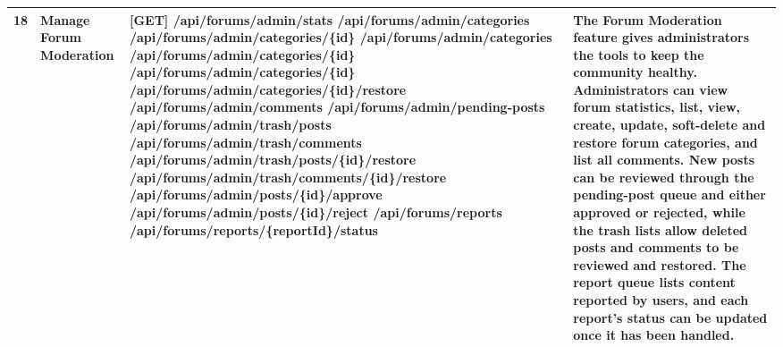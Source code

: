 \begin{longtable}{|C{0.7cm}|L{2.6cm}|S{6.6cm}|L{5.2cm}|}
18
&
\textbf{Manage Forum Moderation}
&
[GET] /\allowbreak{}api/\allowbreak{}forums/\allowbreak{}admin/\allowbreak{}stats \newline
[GET] /\allowbreak{}api/\allowbreak{}forums/\allowbreak{}admin/\allowbreak{}categories \newline
[GET] /\allowbreak{}api/\allowbreak{}forums/\allowbreak{}admin/\allowbreak{}categories/\allowbreak{}\{id\} \newline
[POST] /\allowbreak{}api/\allowbreak{}forums/\allowbreak{}admin/\allowbreak{}categories \newline
[PATCH] /\allowbreak{}api/\allowbreak{}forums/\allowbreak{}admin/\allowbreak{}categories/\allowbreak{}\{id\} \newline
[DELETE] /\allowbreak{}api/\allowbreak{}forums/\allowbreak{}admin/\allowbreak{}categories/\allowbreak{}\{id\} \newline
[PATCH] /\allowbreak{}api/\allowbreak{}forums/\allowbreak{}admin/\allowbreak{}categories/\allowbreak{}\{id\}/\allowbreak{}restore \newline
[GET] /\allowbreak{}api/\allowbreak{}forums/\allowbreak{}admin/\allowbreak{}comments \newline
[GET] /\allowbreak{}api/\allowbreak{}forums/\allowbreak{}admin/\allowbreak{}pending-posts \newline
[GET] /\allowbreak{}api/\allowbreak{}forums/\allowbreak{}admin/\allowbreak{}trash/\allowbreak{}posts \newline
[GET] /\allowbreak{}api/\allowbreak{}forums/\allowbreak{}admin/\allowbreak{}trash/\allowbreak{}comments \newline
[PATCH] /\allowbreak{}api/\allowbreak{}forums/\allowbreak{}admin/\allowbreak{}trash/\allowbreak{}posts/\allowbreak{}\{id\}/\allowbreak{}restore \newline
[PATCH] /\allowbreak{}api/\allowbreak{}forums/\allowbreak{}admin/\allowbreak{}trash/\allowbreak{}comments/\allowbreak{}\{id\}/\allowbreak{}restore \newline
[PATCH] /\allowbreak{}api/\allowbreak{}forums/\allowbreak{}admin/\allowbreak{}posts/\allowbreak{}\{id\}/\allowbreak{}approve \newline
[PATCH] /\allowbreak{}api/\allowbreak{}forums/\allowbreak{}admin/\allowbreak{}posts/\allowbreak{}\{id\}/\allowbreak{}reject \newline
[GET] /\allowbreak{}api/\allowbreak{}forums/\allowbreak{}reports \newline
[PATCH] /\allowbreak{}api/\allowbreak{}forums/\allowbreak{}reports/\allowbreak{}\{reportId\}/\allowbreak{}status
&
The Forum Moderation feature gives administrators the tools to keep the community healthy. Administrators can view forum statistics, list, view, create, update, soft-delete and restore forum categories, and list all comments. New posts can be reviewed through the pending-post queue and either approved or rejected, while the trash lists allow deleted posts and comments to be reviewed and restored. The report queue lists content reported by users, and each report's status can be updated once it has been handled.
\\ \hline


\end{longtable}
